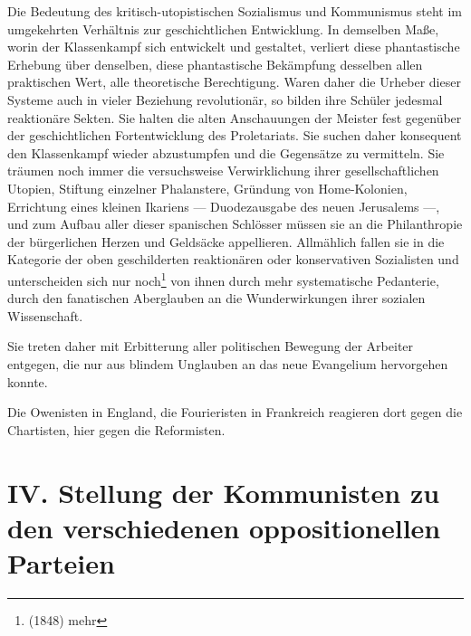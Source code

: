 \documentclass[letterpaper]{article}
\begin{document}
Die Bedeutung des kritisch-utopistischen Sozialismus und Kommunismus steht im umgekehrten Verhältnis zur geschichtlichen Entwicklung. In demselben Maße, worin der Klassenkampf sich entwickelt und gestaltet, verliert diese phantastische Erhebung über denselben, diese phantastische Bekämpfung desselben allen praktischen Wert, alle theoretische Berechtigung. Waren daher die Urheber dieser Systeme auch in vieler Beziehung revolutionär, so bilden ihre Schüler jedesmal reaktionäre Sekten. Sie halten die alten Anschauungen der Meister fest gegenüber der geschichtlichen Fortentwicklung des Proletariats. Sie suchen daher konsequent den Klassenkampf wieder abzustumpfen und die Gegensätze zu vermitteln. Sie träumen noch immer die versuchsweise Verwirklichung ihrer gesellschaftlichen Utopien, Stiftung einzelner Phalanstere, Gründung von Home-Kolonien, Errichtung eines kleinen Ikariens — Duodezausgabe des neuen Jerusalems —, und zum Aufbau aller dieser spanischen Schlösser müssen sie an die Philanthropie der bürgerlichen Herzen und Geldsäcke appellieren. Allmählich fallen sie in die Kategorie der oben geschilderten reaktionären oder konservativen Sozialisten und unterscheiden sich nur noch\footnote{(1848) mehr} von ihnen durch mehr systematische Pedanterie, durch den fanatischen Aberglauben an die Wunderwirkungen ihrer sozialen Wissenschaft.

Sie treten daher mit Erbitterung aller politischen Bewegung der Arbeiter entgegen, die nur aus blindem Unglauben an das neue Evangelium hervorgehen konnte.

Die Owenisten in England, die Fourieristen in Frankreich reagieren dort gegen die Chartisten, hier gegen die Reformisten.

\section{IV. Stellung der Kommunisten zu den verschiedenen oppositionellen Parteien}
\end{document}
